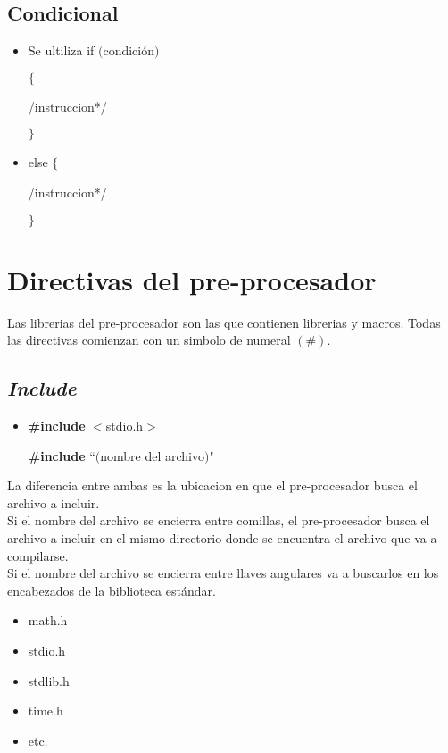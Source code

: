 \documentclass[]{article}
\begin{document}
	\subsection{Condicional}
	
	\begin{itemize}
		\item Se ultiliza if $($condición$)$ 
		
		$\lbrace$
		
		\slash*instruccion*\slash
		
		$\rbrace$
		
		\item else		$\lbrace$
		
		\slash*instruccion*\slash
		
		$\rbrace$ 
	\end{itemize}
	
	\section{Directivas del pre-procesador}
	
	Las librerias del pre-procesador son las que contienen librerias y macros. Todas las directivas comienzan con un simbolo de numeral $(\#)$.
	
	\subsection{\textit{Include}}
	
	\begin{itemize}
		\item \textbf{\#include} $<$stdio.h$>$ 
		
		\textbf{\#include} ``$($nombre del archivo$)$"
	\end{itemize}
	La diferencia entre ambas es la ubicacion en que el pre-procesador busca el archivo a incluir.\\
	
	Si el nombre del archivo se encierra entre comillas, el pre-procesador busca el archivo a incluir en el mismo directorio donde se encuentra el archivo que va a compilarse.\\
	
	Si el nombre del archivo se encierra entre llaves angulares va a buscarlos en los encabezados de la biblioteca estándar.
	
	\begin{itemize}
		\item math.h
		\item stdio.h
		\item stdlib.h
		\item time.h
		\item etc.
	\end{itemize}
	
\end{document}
